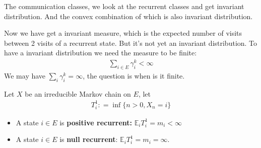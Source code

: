 \begin{example}
The communication classes, we look at the recurrent classes and get invariant distribution. And the convex combination of which is also invariant distribution.	
\end{example}



Now we have get a invariant measure, which is the expected number of visits between 2 visits of a recurrent state. But it's not yet an invariant distribution. To have a invariant distribution we need the measure to be finite:
\begin{align*}
	\sum_{i \in E} \gamma_i^k < \infty
\end{align*}	
We may have $\sum_{i} \gamma_i^k = \infty$, the question is when is it finite.

\begin{definition}
	Let $X$ be an irreducible Markov chain on $E$, let 
	\begin{align*}
		T_i^1 : = \inf\{ n > 0, X_n = i\}
	\end{align*}
	\begin{itemize}
		\item A state $i \in E$ is \textbf{positive recurrent:} $\mathbb{E}_i T_i^1 = m_i < \infty$
		\item A state $i \in E$ is \textbf{null recurrent}: $\mathbb{E}_i T_i^1 = m_i =\infty$.
	\end{itemize}
\end{definition}

